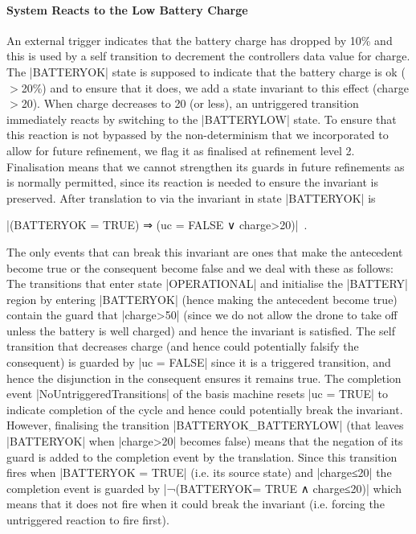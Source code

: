 \paragraph{System Reacts to the Low Battery Charge}
An external trigger indicates that the battery charge has dropped by 10\% and this is used by a self transition to decrement the controllers data value for charge.
The |BATTERYOK| state is supposed to indicate that the battery charge is ok ($>$20\%) and to ensure that it does, we add a state invariant to this effect (charge$>$20).
When charge decreases to 20 (or less), an untriggered transition immediately reacts by switching to the |BATTERYLOW| state.
To ensure that this reaction is not bypassed by the non-determinism that we incorporated to allow for future refinement, we flag it as finalised at refinement level 2.
Finalisation means that we cannot strengthen its guards in future refinements as is normally permitted, since its reaction is needed to ensure the invariant is preserved.
After translation to 
\EVENTB via \UMLB
the invariant in state |BATTERYOK| is 
\begin{center}
 |(BATTERYOK = TRUE) ⇒ (uc = FALSE ∨ charge>20)|~.
\end{center}
The only events that can break this invariant are ones that make the antecedent become true or the consequent become false and we deal with these as follows:
The transitions that enter state |OPERATIONAL| and initialise the |BATTERY| region by entering |BATTERYOK| (hence making the antecedent become true) contain the guard that |charge>50| (since we do not allow the drone to take off unless the battery is well charged) and hence the invariant is satisfied.
The self transition that decreases charge (and hence could potentially falsify the consequent) is guarded by |uc = FALSE| since it is a triggered transition, and hence the disjunction in the consequent ensures it remains true.
The completion event |NoUntriggeredTransitions| of the basis machine resets |uc = TRUE| to indicate completion of the cycle and hence could potentially break the invariant. 
However, finalising the transition |BATTERYOK_BATTERYLOW| (that leaves |BATTERYOK| when |charge>20| becomes false) means that  the negation of its guard is added to the completion event by the translation.
Since this transition fires when |BATTERYOK = TRUE| (i.e. its source state) and |charge≤20| the completion event is guarded by |¬(BATTERYOK= TRUE ∧ charge≤20)| which means that it does not fire when it could break the invariant (i.e. forcing the untriggered reaction to fire first).

